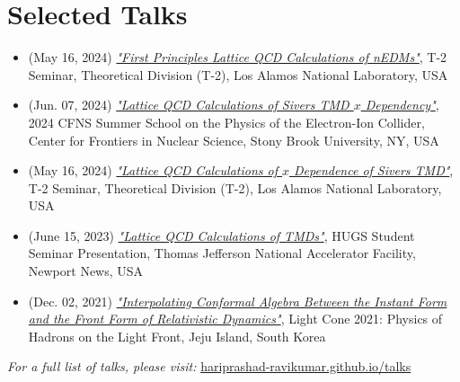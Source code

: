 \documentclass[11pt]{article}
\begin{document}
\section*{Selected Talks}
\vspace{-0.3em}
\begin{itemize}
    \item (May 16, 2024) \href{https://hariprashad-ravikumar.github.io/talks/Los_Alamos_T2_talk_First_Principles_Lattice_QCD_Calculations_of_nEDMs__presentation_Hari_NMSU_June_03_2025.pdf}{\textit{"First Principles Lattice QCD Calculations of nEDMs"}}, T-2 Seminar, Theoretical Division (T-2), Los Alamos National Laboratory, USA

    \item (Jun. 07, 2024) \href{https://indico.cfnssbu.physics.sunysb.edu/event/111/contributions/1001/attachments/335/552/Lattice_QCD_calculations_of_Sivers_TMD_x_dependance____CFNS_school_presentation_Hari__NMSU_Jun_07_2024.pdf}{\textit{"Lattice QCD Calculations of Sivers TMD $x$ Dependency"}}, 2024 CFNS Summer School on the Physics of the Electron-Ion Collider, Center for Frontiers in Nuclear Science, Stony Brook University, NY, USA
    
    \item (May 16, 2024) \href{https://hariprashad-ravikumar.github.io/talks/Lattice_QCD_calculations_of_Sivers_TMD_x_dependance____presentation_Hari__NMSU_May_16_2024.pdf}{\textit{"Lattice QCD Calculations of $x$ Dependence of Sivers TMD"}}, T-2 Seminar, Theoretical Division (T-2), Los Alamos National Laboratory, USA
    
    \item (June 15, 2023) \href{https://indico.jlab.org/event/717/contributions/12720/attachments/9865/14525/Lattice_QCD_calculations_of_TMDs_HUGS_presentation_Hari_NMSU_Jun_15_2023__updated_%20(1).pdf}{\textit{"Lattice QCD Calculations of TMDs"}}, HUGS Student Seminar Presentation, Thomas Jefferson National Accelerator Facility, Newport News, USA
   
    \item (Dec. 02, 2021) \href{https://indico.global/event/13145/contributions/116043/}{\textit{"Interpolating Conformal Algebra Between the Instant Form and the Front Form of Relativistic Dynamics"}}, Light Cone 2021: Physics of Hadrons on the Light Front, Jeju Island, South Korea
\end{itemize}
\noindent\textit{For a full list of talks, please visit:} \href{https://hariprashad-ravikumar.github.io/talks}{hariprashad-ravikumar.github.io/talks}
\end{document}
